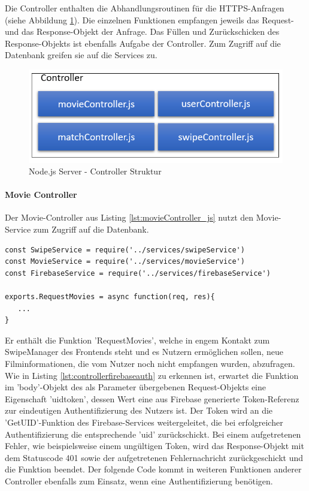 Die Controller enthalten die Abhandlungsroutinen für die HTTPS-Anfragen (siehe Abbildung \ref{ControllerStruktur}). Die einzelnen Funktionen empfangen jeweils das Request- und das Response-Objekt der Anfrage. Das Füllen und Zurückschicken des Response-Objekts ist ebenfalls Aufgabe der Controller. Zum Zugriff auf die Datenbank greifen sie auf die Services zu.\\



\begin{figure}[tbt]
\centering
\includegraphics[width=12cm]{images/controllerStruktur.PNG}
\caption{Node.js Server - Controller Struktur}
\label{ControllerStruktur}
\end{figure}

\paragraph{Movie Controller}

Der Movie-Controller  aus Listing \ref{lst:movieController_js} nutzt den Movie-Service zum Zugriff auf die Datenbank. \\

\begin{lstlisting}[caption=movieController.js Imports und Funktionen, label=lst:movieController_js]
const SwipeService = require('../services/swipeService')
const MovieService = require('../services/movieService')
const FirebaseService = require('../services/firebaseService')

exports.RequestMovies = async function(req, res){
   ...
}
\end{lstlisting}

\noindent
Er enthält die Funktion 'RequestMovies', welche in engem Kontakt zum SwipeManager des Frontends steht und es Nutzern ermöglichen sollen, neue Filminformationen, die vom Nutzer noch nicht empfangen wurden, abzufragen.
\newline
Wie in Listing \ref{lst:controllerfirebaseauth} zu erkennen ist, erwartet die Funktion im 'body'-Objekt des als Parameter übergebenen Request-Objekts eine Eigenschaft 'uidtoken', dessen Wert eine aus Firebase generierte Token-Referenz zur eindeutigen Authentifizierung des Nutzers ist. Der Token wird an die 'GetUID'-Funktion des Firebase-Services weitergeleitet, die bei erfolgreicher Authentifizierung die entsprechende 'uid' zurückschickt. Bei einem aufgetretenen Fehler, wie beispielsweise einem ungültigen Token, wird das Response-Objekt mit dem Statuscode 401 sowie der aufgetretenen Fehlernachricht zurückgeschickt und die Funktion beendet. Der folgende Code kommt in weiteren Funktionen anderer Controller ebenfalls zum Einsatz, wenn eine Authentifizierung benötigen.

